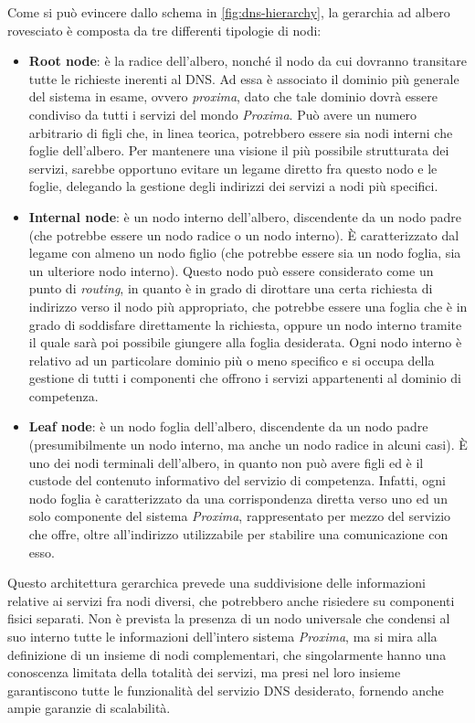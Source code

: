 \documentclass[a4paper,12pt]{report}
\begin{document}
Come si può evincere dallo schema in \autoref{fig:dns-hierarchy}, la gerarchia ad albero rovesciato è composta da tre differenti tipologie di nodi:
\begin{itemize}
	\item \textbf{Root node}: è la radice dell'albero, nonché il nodo da cui dovranno transitare tutte le richieste inerenti al DNS. Ad essa è associato il dominio più generale del sistema in esame, ovvero \emph{proxima}, dato che tale dominio dovrà essere condiviso da tutti i servizi del mondo \emph{Proxima}. Può avere un numero arbitrario di figli che, in linea teorica, potrebbero essere sia nodi interni che foglie dell'albero. Per mantenere una visione il più possibile strutturata dei servizi, sarebbe opportuno evitare un legame diretto fra questo nodo e le foglie, delegando la gestione degli indirizzi dei servizi a nodi più specifici.
	\item \textbf{Internal node}: è un nodo interno dell'albero, discendente da un nodo padre (che potrebbe essere un nodo radice o un nodo interno). È caratterizzato dal legame con almeno un nodo figlio (che potrebbe essere sia un nodo foglia, sia un ulteriore nodo interno). Questo nodo può essere considerato come un punto di \emph{routing}, in quanto è in grado di dirottare una certa richiesta di indirizzo verso il nodo più appropriato, che potrebbe essere una foglia che è in grado di soddisfare direttamente la richiesta, oppure un nodo interno tramite il quale sarà poi possibile giungere alla foglia desiderata. Ogni nodo interno è relativo ad un particolare dominio più o meno specifico e si occupa della gestione di tutti i componenti che offrono i servizi appartenenti al dominio di competenza.
	\item \textbf{Leaf node}: è un nodo foglia dell'albero, discendente da un nodo padre (presumibilmente un nodo interno, ma anche un nodo radice in alcuni casi). È uno dei nodi terminali dell'albero, in quanto non può avere figli ed è il custode del contenuto informativo del servizio di competenza. Infatti, ogni nodo foglia è caratterizzato da una corrispondenza diretta verso uno ed un solo componente del sistema \emph{Proxima}, rappresentato per mezzo del servizio che offre, oltre all'indirizzo utilizzabile per stabilire una comunicazione con esso.
\end{itemize}

Questo architettura gerarchica prevede una suddivisione delle informazioni relative ai servizi fra nodi diversi, che potrebbero anche risiedere su componenti fisici separati. Non è prevista la presenza di un nodo universale che condensi al suo interno tutte le informazioni dell'intero sistema \emph{Proxima}, ma si mira alla definizione di un insieme di nodi complementari, che singolarmente hanno una conoscenza limitata della totalità dei servizi, ma presi nel loro insieme garantiscono tutte le funzionalità del servizio DNS desiderato, fornendo anche ampie garanzie di scalabilità.
\end{document}
